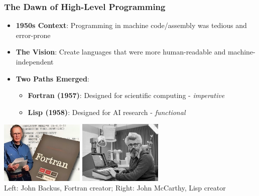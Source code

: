 \documentclass{beamer}
\begin{document}
\begin{frame}[t]
\frametitle{The Dawn of High-Level Programming}
\begin{itemize}
    \item \textbf{1950s Context}: Programming in machine code/assembly was tedious and error-prone
    \item \textbf{The Vision}: Create languages that were more human-readable and machine-independent
    \item \textbf{Two Paths Emerged}:
    \begin{itemize}
        \item \textbf{Fortran (1957)}: Designed for scientific computing - \textit{imperative}
        \item \textbf{Lisp (1958)}: Designed for AI research - \textit{functional}
    \end{itemize}
\end{itemize}

\begin{center}
    \includegraphics[width=0.3\textwidth]{images/fortran.jpg}
    \quad
    \includegraphics[width=0.3\textwidth]{images/lisp.jpg}
    \\\scriptsize{Left: John Backus, Fortran creator; Right: John McCarthy, Lisp creator}
\end{center}
\end{frame}
\end{document}
